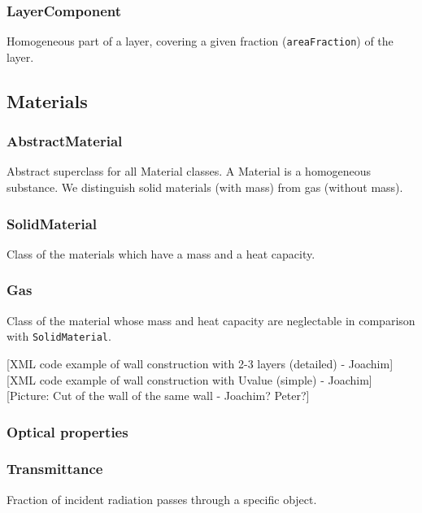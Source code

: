 \documentclass[a4paper,12pt]{article}
\begin{document}
\subsubsection{LayerComponent}\label{layercomponent}

Homogeneous part of a layer, covering a given fraction
(\texttt{areaFraction}) of the layer.

\subsection{Materials}\label{materials}

\subsubsection{AbstractMaterial}\label{abstractmaterial}

Abstract superclass for all Material classes. A Material is a
homogeneous substance. We distinguish solid materials (with mass) from
gas (without mass).

\subsubsection{SolidMaterial}\label{solidmaterial}

Class of the materials which have a mass and a heat capacity.

\subsubsection{Gas}\label{gas}

Class of the material whose mass and heat capacity are neglectable in
comparison with \texttt{SolidMaterial}.

{[}XML code example of wall construction with 2-3 layers (detailed) -
Joachim{]}{[}XML code example of wall construction with Uvalue (simple)
- Joachim{]} {[}Picture: Cut of the wall of the same wall - Joachim?
Peter?{]}

\subsubsection{Optical properties}\label{optical-properties}

\subsubsection{Transmittance}\label{transmittance}

Fraction of incident radiation passes through a specific object.
\end{document}
